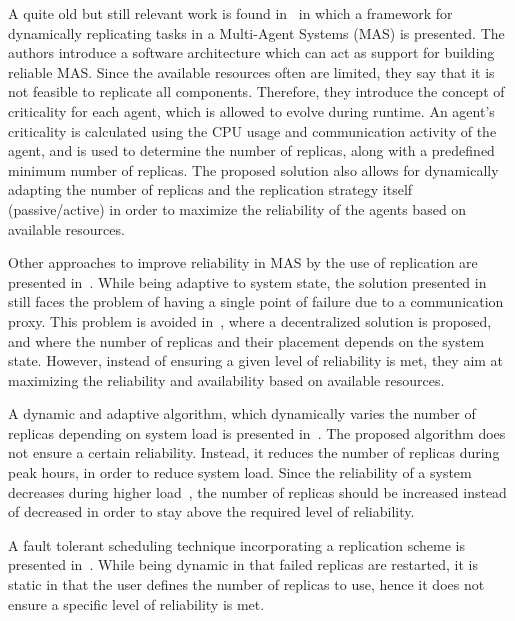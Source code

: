 \documentclass{cslthse-msc}
\begin{document}
A quite old but still relevant work is found in~\cite{dynAdaptRepl} in which a framework for dynamically replicating tasks in a Multi-Agent Systems (MAS) is presented. The authors introduce a software architecture which can act as support for building reliable MAS. Since the available resources often are limited, they say that it is not feasible to replicate all components. Therefore, they introduce the concept of criticality for each agent, which is allowed to evolve during runtime. An agent's criticality is calculated using the CPU usage and communication activity of the agent, and is used to determine the number of replicas, along with a predefined minimum number of replicas. The proposed solution also allows for dynamically adapting the number of replicas and the replication strategy itself (passive/active) in order to maximize the reliability of the agents based on available resources. 

Other approaches to improve reliability in MAS by the use of replication are presented in~\cite{replicatingAgents, adaptiveMASReplication, adaptiveAgentReplication}. While being adaptive to system state, the solution presented in~\cite{replicatingAgents} still faces the problem of having a single point of failure due to a communication proxy. This problem is avoided in~\cite{adaptiveMASReplication}, where a decentralized solution is proposed, and where the number of replicas and their placement depends on the system state. However, instead of ensuring a given level of reliability is met, they aim at maximizing the reliability and availability based on available resources.

A dynamic and adaptive algorithm, which dynamically varies the number of replicas depending on system load is presented in~\cite{adaptiveCheckPointAndRep}. The proposed algorithm does not ensure a certain reliability. Instead, it reduces the number of replicas during peak hours, in order to reduce system load. Since the reliability of a system decreases during higher load~\cite{studyOfFailures, implicationsOfFailures}, the number of replicas should be increased instead of decreased in order to stay above the required level of reliability.

A fault tolerant scheduling technique incorporating a replication scheme is presented in~\cite{faultTolerantSchedPolicy}. While being dynamic in that failed replicas are restarted, it is static in that the user defines the number of replicas to use, hence it does not ensure a specific level of reliability is met.
\end{document}
